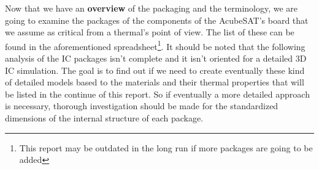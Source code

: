 \documentclass[final]{cubedoc}
\begin{document}
	
	
	
	
	
	Now that we have an \textbf{overview} of the packaging and the terminology, we are going to examine the packages of the components of the AcubeSAT's board that we assume as critical from a thermal's point of view. The list of these can be found in the aforementioned spreadsheet\footnote{This report may be outdated in the long run if more packages are going to be added}. It should be noted that the following analysis of the IC packages isn't complete and it isn't oriented for a detailed 3D IC simulation. The goal is to find out if we need to create eventually these kind of detailed models based to the materials and their thermal properties that will be listed in the continue of this report. So if eventually a more detailed approach  is necessary, thorough investigation should be made for the standardized dimensions of the internal structure of each package. 
	
\end{document}
